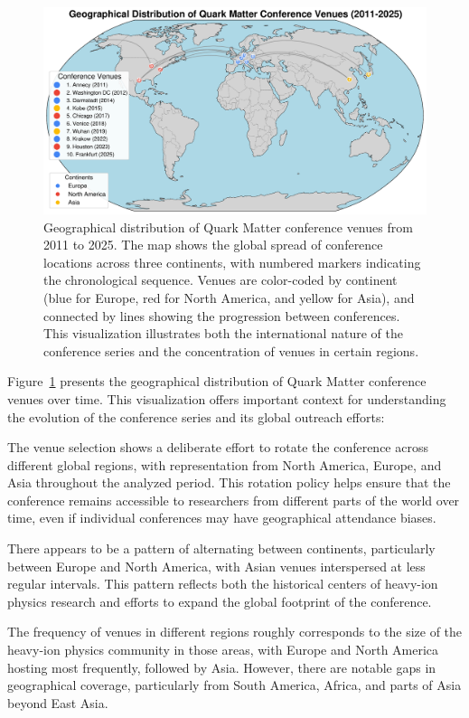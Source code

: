 \documentclass[a4paper,11pt]{article}
\begin{document}
\begin{figure}[H]
\centering
\includegraphics[width=\textwidth]{figures/conference_venues.pdf}
\caption{Geographical distribution of Quark Matter conference venues from 2011 to 2025. The map shows the global spread of conference locations across three continents, with numbered markers indicating the chronological sequence. Venues are color-coded by continent (blue for Europe, red for North America, and yellow for Asia), and connected by lines showing the progression between conferences. This visualization illustrates both the international nature of the conference series and the concentration of venues in certain regions.}
\label{fig:venues}
\end{figure}

Figure~\ref{fig:venues} presents the geographical distribution of Quark Matter conference venues over time. This visualization offers important context for understanding the evolution of the conference series and its global outreach efforts:

The venue selection shows a deliberate effort to rotate the conference across different global regions, with representation from North America, Europe, and Asia throughout the analyzed period. This rotation policy helps ensure that the conference remains accessible to researchers from different parts of the world over time, even if individual conferences may have geographical attendance biases.

There appears to be a pattern of alternating between continents, particularly between Europe and North America, with Asian venues interspersed at less regular intervals. This pattern reflects both the historical centers of heavy-ion physics research and efforts to expand the global footprint of the conference.

The frequency of venues in different regions roughly corresponds to the size of the heavy-ion physics community in those areas, with Europe and North America hosting most frequently, followed by Asia. However, there are notable gaps in geographical coverage, particularly from South America, Africa, and parts of Asia beyond East Asia.
\end{document}

